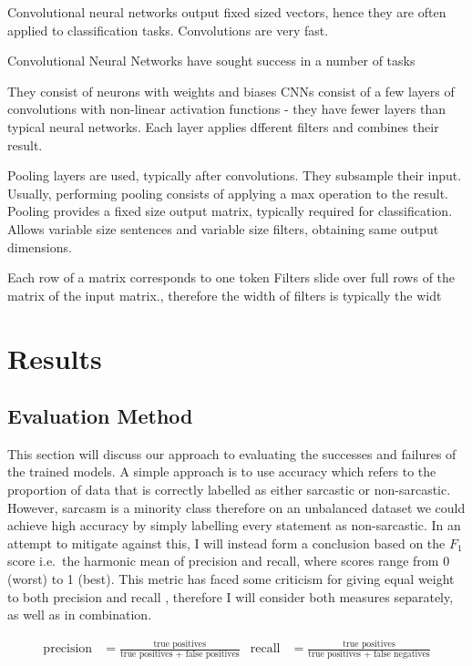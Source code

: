 \documentclass[12pt,a4paper]{article}
\begin{document}
Convolutional neural networks output fixed sized vectors, hence they are often applied to classification tasks. Convolutions are very fast.

Convolutional Neural Networks have sought success in a number of tasks



They consist of neurons with weights and biases
CNNs consist of a few layers of convolutions with non-linear activation functions - they have fewer layers than typical neural networks. Each layer applies dfferent filters and combines their result.

Pooling layers are used, typically after convolutions. They subsample their input. Usually, performing pooling consists of applying a max operation to the result. Pooling provides a fixed size output matrix, typically required for classification. Allows variable size sentences and variable size filters, obtaining same output dimensions. 

Each row of a matrix corresponds to one token
Filters slide over full rows of the matrix of the input matrix., therefore the width of filters is typically the widt




\section{Results}
\subsection{Evaluation Method}
\noindent This section will discuss our approach to evaluating the successes and failures of the trained models. A simple approach is to use accuracy which refers to the proportion of data that is correctly labelled as either sarcastic or non-sarcastic. However, sarcasm is a minority class therefore on an unbalanced dataset we could achieve high accuracy by simply labelling every statement as non-sarcastic. In an attempt to mitigate against this, I will instead form a conclusion based on the $F_{1}$ score i.e.\ the harmonic mean of precision and recall, where scores range from 0 (worst) to 1 (best). This metric has faced some criticism for giving equal weight to both precision and recall \cite{hand2018note}, therefore I will consider both measures separately, as well as in combination.

\begin{align*}
\mbox{precision} &= \frac{\mbox{true positives}}{\mbox{true positives + false positives}}   &  \mbox{recall} &= \frac{\mbox{true positives}}{\mbox{true positives + false negatives}}
\end{align*}
\end{document}
